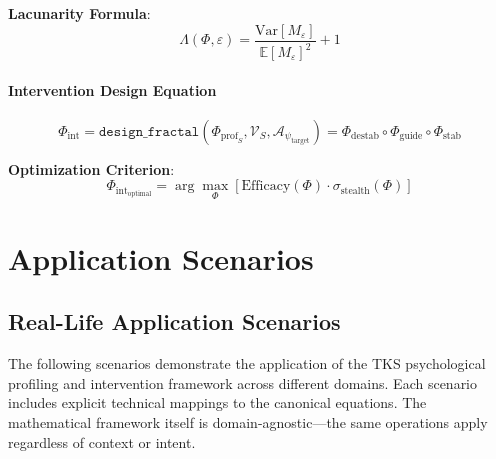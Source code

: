 \documentclass[11pt,twoside]{book}
\newcommand{\Frac}{\Phi}
\newcommand{\Lacunarity}{\Lambda}
\newcommand{\PsychAttractor}{\mathcal{A}_\psi}
\newcommand{\ManipFrac}{\Phi_{\mathrm{int}}}
\newcommand{\ProfileFrac}{\Phi_{\mathrm{prof}}}
\newcommand{\VulnSet}{\mathcal{V}}
\newcommand{\StealthFactor}{\sigma_{\mathrm{stealth}}}
\begin{document}
\textbf{Lacunarity Formula}:
\[
    \Lacunarity(\Frac, \varepsilon) = \frac{\mathrm{Var}[M_\varepsilon]}{\mathbb{E}[M_\varepsilon]^2} + 1
\]

\subsection{Intervention Design Equation}

\begin{equation}
\boxed{
    \ManipFrac = \texttt{design\_fractal}(\ProfileFrac_S, \VulnSet_S, \PsychAttractor_{\mathrm{target}}) =
    \Frac_{\mathrm{destab}} \circ \Frac_{\mathrm{guide}} \circ \Frac_{\mathrm{stab}}
}
\end{equation}

\textbf{Optimization Criterion}:
\[
    \ManipFrac_{\mathrm{optimal}} = \arg\max_\Frac
    \left[ \text{Efficacy}(\Frac) \cdot \StealthFactor(\Frac) \right]
\]

\part{Application Scenarios}

\chapter{Real-Life Application Scenarios}
\label{ch:scenarios}

\begin{tcolorbox}[colback=blue!5!white,colframe=blue!75!black,title=\textbf{Documentation Note},breakable]
The following scenarios demonstrate the application of the TKS psychological profiling
and intervention framework across different domains. Each scenario includes explicit
technical mappings to the canonical equations. The mathematical framework itself is
domain-agnostic---the same operations apply regardless of context or intent.
\end{tcolorbox}
\end{document}
